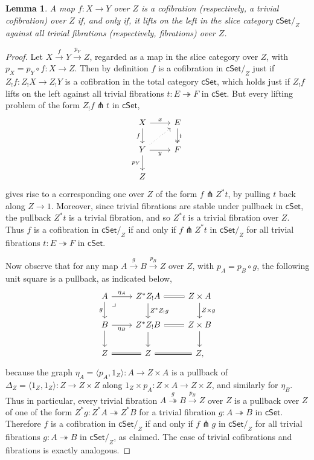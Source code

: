 \documentclass[11pt,reqno]{amsart}
\newcommand{\cSet}{\ensuremath{\mathsf{cSet}}}
\newcommand{\cSetZ}{\ensuremath{\mathsf{cSet}/_{\!Z}}}
\newcommand{\fib}{\ensuremath{\twoheadrightarrow}}
\renewcommand{\to}{\ensuremath{\rightarrow}}
\newcommand{\too}{\ensuremath{\longrightarrow}}
\newcommand{\pair}[1]{\ensuremath{\langle #1\rangle}}
\newtheorem{lemma}[theorem]{Lemma}
\theoremstyle{remark}
\theoremstyle{definition}
\newcommand{\pbmark}{\ar[dr, phantom, "\lrcorner" very near start, shift right=.5ex]}	%
\begin{document}
\begin{lemma}\label{lem:slicepremodellifting2}
A map $f : X \to Y$ over $Z$  is a cofibration (respectively, a trivial cofibration) over $Z$ if, and only if, it lifts on the left in the slice category $\cSetZ$ against all trivial fibrations (respectively, fibrations) over $Z$.
\end{lemma}
%
\begin{proof}
Let $X \stackrel{f}{\to} Y \stackrel{p_Y}{\too} Z$, regarded as a map in the slice category over $Z$, with $p_X = p_Y \circ f : X \to Z$.  Then by definition $f$ is a cofibration in $\cSetZ$ just if $Z_! f : Z_! X\to Z_! Y$ is a cofibration in the total category $\cSet$, which holds just if $Z_! f$ lifts on the left against all trivial fibrations $t : E \fib F$ in $\cSet$.  
But every lifting problem of the form $Z_! f\pitchfork t$ in $\cSet$,
\[\begin{tikzcd}
X \ar[d,swap, "f"] \ar[r, "x" ] & E \ar[d, two heads, "t"] \\  
Y  \ar[r, swap, "y" ] \ar[ru, dotted] \ar[d,swap, "{p_Y}"] & F  \\
Z &
 \end{tikzcd}\]
gives rise to a corresponding one over $Z$ of the form $f\pitchfork Z^*t$, by pulling $t$ back along $Z \to 1$. Moreover, since trivial fibrations are stable under pullback in $\cSet$, the pullback $Z^*t$ is a trivial fibration, and so $Z^*t$ is a trivial fibration over $Z$.  Thus $f$ is a cofibration in $\cSetZ$ if and only if $f\pitchfork Z^*t$ in $\cSetZ$ for all trivial fibrations $t : E\fib F$ in $\cSet$.  

Now observe that for any map $A \stackrel{g}{\to} B \stackrel{p_B}{\too} Z$ over $Z$, with $p_A = p_B\circ g$, the following unit square is a pullback, as indicated below,
\begin{equation}\label{eq:unitgraphpullback}
\begin{tikzcd}
A \ar[d,swap, "g"] \ar[r, "\eta_A" ] \pbmark & Z^*Z_!A  \ar[d, "Z^*Z_!g"] \ar[r, equals] & Z\times A \ar[d, "Z\times g"] \\  
B  \ar[r, swap, "\eta_B" ]   \ar[d] & Z^*Z_!B   \ar[d] \ar[r, equals] & Z\times B  \ar[d] \\
Z  \ar[r, equals] & Z  \ar[r, equals] & Z,
 \end{tikzcd}
 \end{equation}
because the graph $\eta_A = \pair{p_A, 1_Z} : A \to Z\times A$ is a pullback of $\Delta_Z = \pair{1_Z, 1_Z} : Z \to Z\times Z$ along $1_Z \times p_A : Z\times A \to Z\times Z$, and similarly for $\eta_B$.  Thus in particular, every trivial fibration $A \stackrel{g}{\fib} B \stackrel{p_B}{\too} Z$ over $Z$ is a pullback over $Z$ of one of the form $Z^*g : Z^*A \fib Z^*B$ for a trivial fibration $g : A\fib B$ in $\cSet$.  Therefore $f$ is a cofibration in $\cSetZ$ if and only if $f\pitchfork g$ in $\cSetZ$ for all trivial fibrations $g : A\fib B$ in $\cSetZ$, as claimed. 
The case of trivial cofibrations and fibrations is exactly analogous.
\end{proof}
\end{document}
